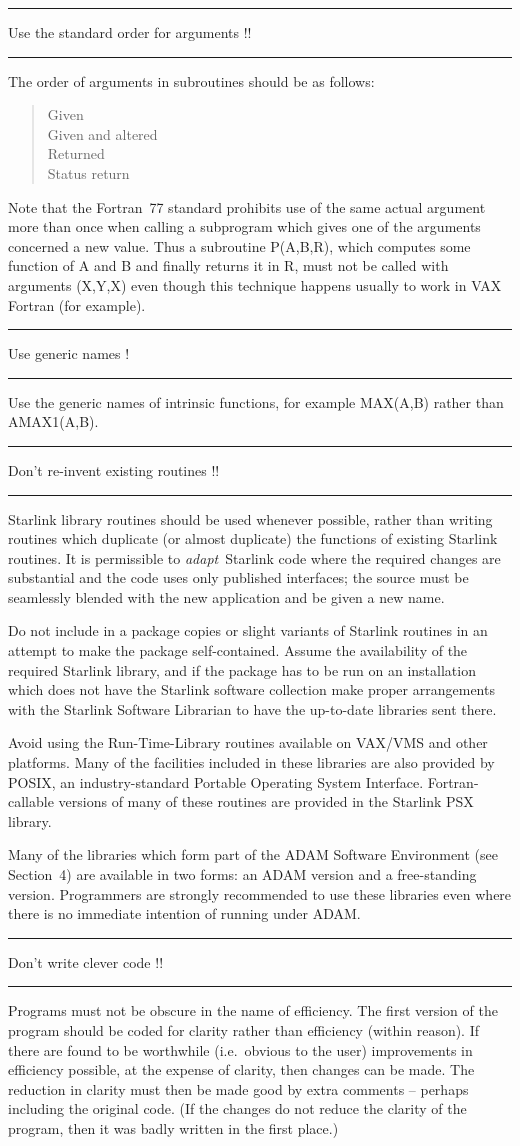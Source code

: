 \documentclass[twoside,11pt]{article}
\newcounter{sruleno}
\newcommand{\srule}[1]{
    \addtocounter{sruleno}{1}
    \goodbreak
    \rule[0.5ex]{\textwidth}{0.3mm}
    {\Large #1 \hfill {\thesruleno}}
    \rule[0.5ex]{\textwidth}{0.1mm}
}
\newcommand{\srule}[1]{
       \addtocounter{sruleno}{1}
       \begin{rawhtml} <HR> \end{rawhtml}
       {\Large \thesruleno}~~~~{\Large #1}
       \begin{rawhtml} <HR> \end{rawhtml}
       \end{tabular}
  }
\renewcommand{\_}{{\tt\char'137}}
\begin{document}
\srule{Use the standard order for arguments !!}
The order of arguments in subroutines should be as follows:
\begin{quote}
Given\\
Given and altered\\
Returned\\
Status return
\end{quote}
Note that the Fortran~77 standard prohibits use of the same actual argument more
than once when calling a subprogram which gives one of the arguments concerned a
new value.  Thus a subroutine \mbox{P(A,B,R)},
which computes some function of A and B and finally returns it in R, must not
be called with arguments (X,Y,X) even
though this technique happens usually to work in VAX Fortran (for example).

\srule{Use generic names !}
Use the generic names of intrinsic functions, for example
MAX(A,B) rather than AMAX1(A,B).

\srule{Don't re-invent existing routines !!}
Starlink library routines should be used whenever possible, rather than
writing routines which duplicate (or almost duplicate) the functions of
existing Starlink routines.
It is permissible to {\it adapt}\, Starlink code where the required changes are
substantial and the code uses only published interfaces; the source must be
seamlessly blended with the new application and be given a new name.

Do not include in a package copies or slight variants of
Starlink routines in an attempt to make the package self-contained.
Assume the availability of the required Starlink library, and if the package has
to be run on an installation which does not have the Starlink software
collection make proper arrangements with the Starlink Software Librarian
to have the up-to-date libraries sent there.

Avoid using the Run-Time-Library routines available on VAX/VMS and other
platforms.  Many of the facilities included in these libraries are also
provided by POSIX, an industry-standard Portable Operating System Interface.
Fortran-callable versions of many of these routines are provided in the
Starlink PSX library.

Many of the libraries which form part of the ADAM Software
Environment (see Section~4) are available in two forms:  an
ADAM version and a free-standing version.  Programmers are
strongly recommended to use these libraries even where there
is no immediate intention of running under ADAM.

\srule{Don't write clever code !!}
Programs must not be obscure in the name of efficiency.
The first version of the program should be coded for clarity rather than
efficiency (within reason).
If there are found to be worthwhile (i.e.\ obvious to the user) improvements in
efficiency possible, at the expense of clarity, then changes can be made.
The reduction in clarity must then be made good by extra comments -- perhaps
including the original code.
(If the changes do not reduce the clarity of the program, then it was badly
written in the first place.)
\end{document}

